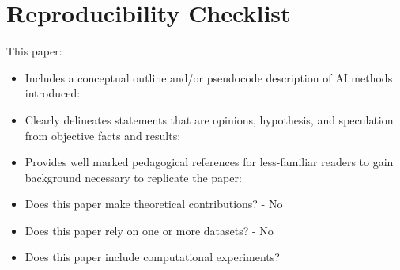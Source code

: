 %



\section*{Reproducibility Checklist}

 This paper:
    \begin{itemize}
        \item Includes a conceptual outline and/or pseudocode description of AI methods introduced: \checkmark
        \item Clearly delineates statements that are opinions, hypothesis, and speculation from objective facts and results: \checkmark
        \item Provides well marked pedagogical references for less-familiar readers to gain background necessary to replicate the paper: \checkmark
        \item Does this paper make theoretical contributions? - No
        \item Does this paper rely on one or more datasets? - No
        \item Does this paper include computational experiments? \checkmark


\end{itemize}
